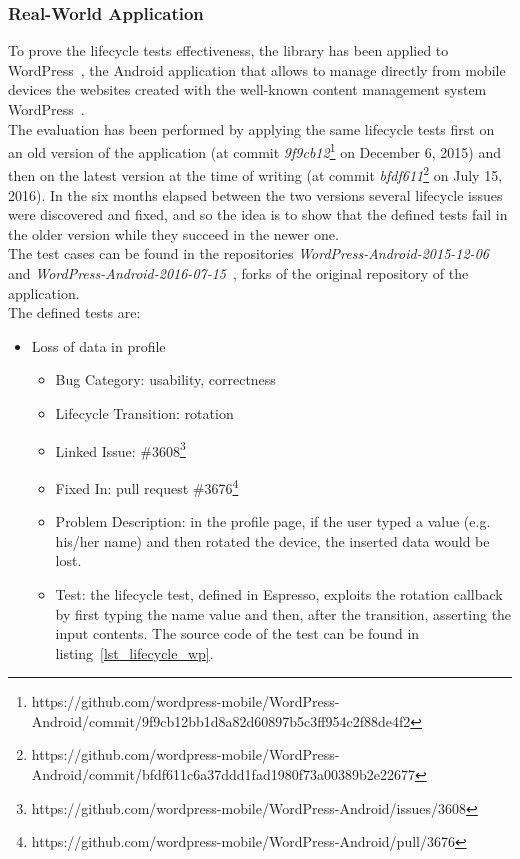 \documentclass[11pt,a4paper,notitlepage]{article}
\begin{document}
{\subsubsection{Real-World Application}
To prove the lifecycle tests effectiveness, the library has been applied to WordPress~\cite{WordPressApp}, the Android application that allows to manage directly from mobile devices the websites created with the well-known content management system WordPress~\cite{WordPressCMS}.\bigskip \\
The evaluation has been performed by applying the same lifecycle tests first on an old version of the application (at commit \textit{9f9cb12}\footnote{https://github.com/wordpress-mobile/WordPress-Android/commit/9f9cb12bb1d8a82d60897b5c3ff954c2f88de4f2} on December 6, 2015) and then on the latest version at the time of writing (at commit \textit{bfdf611}\footnote{https://github.com/wordpress-mobile/WordPress-Android/commit/bfdf611c6a37ddd1fad1980f73a00389b2e22677} on July 15, 2016). In the six months elapsed between the two versions several lifecycle issues were discovered and fixed, and so the idea is to show that the defined tests fail in the older version while they succeed in the newer one.\bigskip \\
The test cases can be found in the repositories \textit{WordPress-Android-2015-12-06}~\cite{WordPress2015-12-06} and \textit{WordPress-Android-2016-07-15}~\cite{WordPress2016-07-15}, forks of the original repository of the application.\bigskip \\
The defined tests are:
\begin{itemize}
	\item Loss of data in profile
	\begin{itemize}
		\item Bug Category: usability, correctness
		\item Lifecycle Transition: rotation
		\item Linked Issue: \#3608\footnote{https://github.com/wordpress-mobile/WordPress-Android/issues/3608}
		\item Fixed In: pull request \#3676\footnote{https://github.com/wordpress-mobile/WordPress-Android/pull/3676} 
		\item Problem Description: in the profile page, if the user typed a value (e.g. his/her name) and then rotated the device, the inserted data would be lost.
		\item Test: the lifecycle test, defined in Espresso, exploits the rotation callback by first typing the name value and then, after the transition, asserting the input contents. The source code of the test can be found in listing~\ref{lst_lifecycle_wp}.

\end{itemize}
\end{itemize}}
\end{document}
